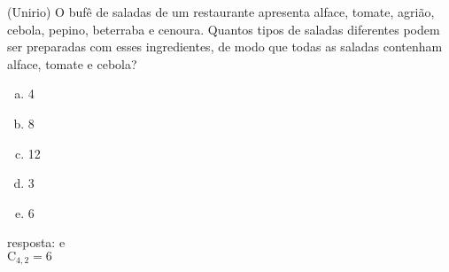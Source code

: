\begin{ex}
 (Unirio) O bufê de saladas de um restaurante apresenta alface, tomate, agrião, cebola, pepino, beterraba e cenoura. Quantos tipos de saladas diferentes podem ser preparadas com esses  ingredientes, de modo que todas as saladas contenham alface, tomate e cebola?
    \begin{enumerate}[(a)]
    \item 4
    \item 8
    \item 12
    \item 3
    \item 6
    \end{enumerate}
      \begin{sol}
       resposta: e \\
       $\mathrm{C}_{4,2} = 6$
      \end{sol}
\end{ex}